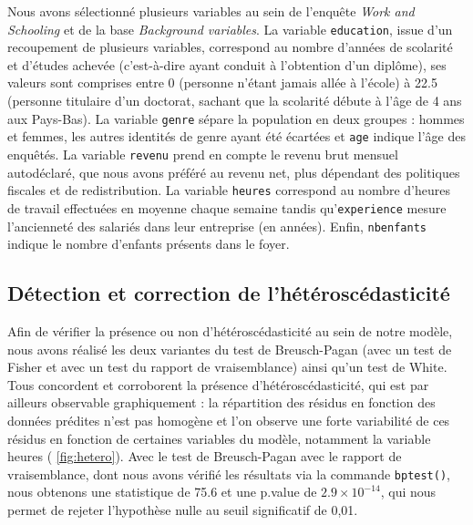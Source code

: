 \documentclass[a4paper, french, 11 pt]{article}\usepackage[]{graphicx}\usepackage[]{xcolor}
\begin{document}
Nous avons sélectionné plusieurs variables au sein de l’enquête \textit{Work and Schooling} et de la base \textit{Background variables}. La variable \verb+education+, issue d’un recoupement de plusieurs variables, correspond au nombre d’années de scolarité et d’études achevée (c’est-à-dire ayant conduit à l’obtention d’un diplôme), ses valeurs sont comprises entre 0 (personne n’étant jamais allée à l’école) à 22.5 (personne titulaire d’un doctorat, sachant que la scolarité débute à l’âge de 4 ans aux Pays-Bas). La variable \verb+genre+ sépare la population en deux groupes : hommes et femmes, les autres identités de genre ayant été écartées et \verb+age+ indique l’âge des enquêtés. La variable \verb+revenu+ prend en compte le revenu brut mensuel autodéclaré, que nous avons préféré au revenu net, plus dépendant des politiques fiscales et de redistribution. La variable \verb+heures+ correspond au nombre d’heures de travail effectuées en moyenne chaque semaine tandis qu’\verb+experience+ mesure l’ancienneté des salariés dans leur entreprise (en années). Enfin, \verb+nbenfants+ indique le nombre d’enfants présents dans le foyer. 

\subsection{Détection et correction de l’hétéroscédasticité}





Afin de vérifier la présence ou non d’hétéroscédasticité au sein de notre modèle, nous avons réalisé les deux variantes du test de Breusch-Pagan (avec un test de Fisher et avec un test du rapport de vraisemblance) ainsi qu’un test de White. Tous concordent et corroborent la présence d’hétéroscédasticité, qui est par ailleurs observable graphiquement : la répartition des résidus en fonction des données prédites n’est pas homogène et l’on observe une forte variabilité de ces résidus en fonction de certaines variables du modèle, notamment la variable heures ( \ref{fig:hetero}). Avec le test de Breusch-Pagan avec le rapport de vraisemblance, dont nous avons vérifié les résultats via la commande \verb+bptest()+, nous obtenons une statistique de 75.6 et une p.value de \ensuremath{2.9\times 10^{-14}}, qui nous permet de rejeter l’hypothèse nulle au seuil significatif de 0,01. 
\end{document}
